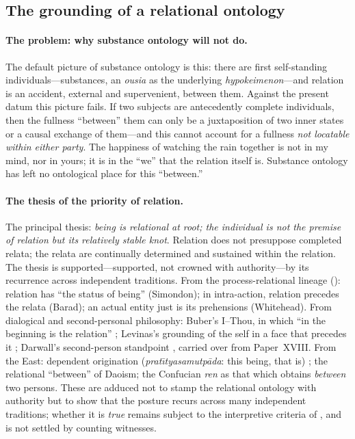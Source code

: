 \subsection{The grounding of a relational ontology}
\label{p19:sub:gen-relational}

\paragraph{The problem: why substance ontology will not do.} The default picture of substance ontology is this: there are first self-standing individuals---substances, an \emph{ousia} as the underlying \emph{hypokeimenon}---and relation is an accident, external and supervenient, between them. Against the present datum this picture fails. If two subjects are antecedently complete individuals, then the fullness ``between'' them can only be a juxtaposition of two inner states or a causal exchange of them---and this cannot account for a fullness \emph{not locatable within either party}. The happiness of watching the rain together is not in my mind, nor in yours; it is in the ``we'' that the relation itself is. Substance ontology has left no ontological place for this ``between.''

\paragraph{The thesis of the priority of relation.} The principal thesis: \emph{being is relational at root; the individual is not the premise of relation but its relatively stable knot}. Relation does not presuppose completed relata; the relata are continually determined and sustained within the relation. The thesis is supported---supported, not crowned with authority---by its recurrence across independent traditions. From the process-relational lineage (): relation has ``the status of being'' (Simondon); in intra-action, relation precedes the relata (Barad); an actual entity just is its prehensions (Whitehead). From dialogical and second-personal philosophy: Buber's I--Thou, in which ``in the beginning is the relation'' \parencite{buber1970}; Levinas's grounding of the self in a face that precedes it \parencite{levinas1969}; Darwall's second-person standpoint \parencite{darwall2006}, carried over from Paper~XVIII. From the East: dependent origination (\emph{prat\={\i}tyasamutp\={a}da}: this being, that is) \parencite{nagarjuna1995}; the relational ``between'' of Daoism; the Confucian \emph{ren} as that which obtains \emph{between} two persons. These are adduced not to stamp the relational ontology with authority but to show that the posture recurs across many independent traditions; whether it is \emph{true} remains subject to the interpretive criteria of , and is not settled by counting witnesses.

